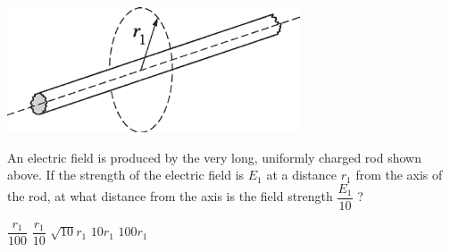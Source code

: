 \begin{center}
\includegraphics[scale=0.5]{images/img-010-030.png}
\end{center}

\begin{questions}\setcounter{question}{32}\question
An electric field is produced by the very long, uniformly charged rod shown above. If the strength of the electric field is $E_{1}$ at a distance $r_{1}$ from the axis of the rod, at what distance from the axis is the field strength $\dfrac{E_{1}}{10}$ ?

\begin{oneparchoices}
\choice $\dfrac{r_{1}}{100}$
\choice $\dfrac{r_{1}}{10}$
\choice $\sqrt{10} r_{1}$
\choice $10 r_{1}$
\choice $100 r_{1}$
\end{oneparchoices}\end{questions}

